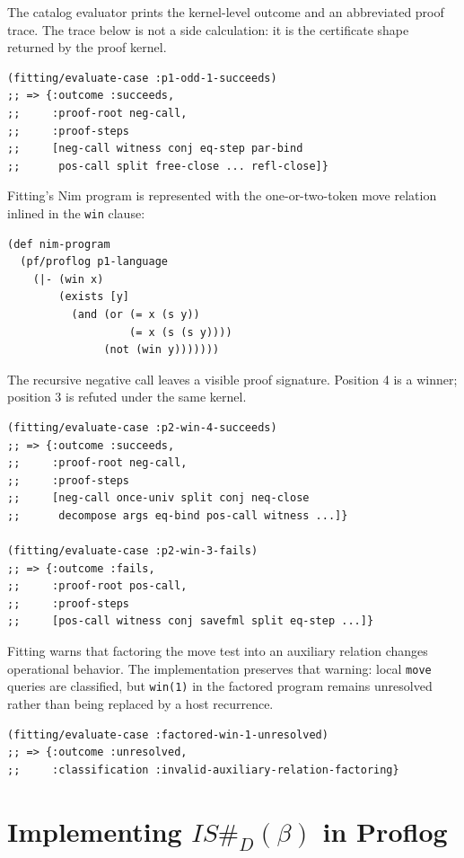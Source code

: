 \documentclass[runningheads]{llncs}
\begin{document}
The catalog evaluator prints the kernel-level outcome and an abbreviated proof
trace.  The trace below is not a side calculation: it is the certificate shape
returned by the proof kernel.

\begin{lstlisting}
(fitting/evaluate-case :p1-odd-1-succeeds)
;; => {:outcome :succeeds,
;;     :proof-root neg-call,
;;     :proof-steps
;;     [neg-call witness conj eq-step par-bind
;;      pos-call split free-close ... refl-close]}
\end{lstlisting}

Fitting's Nim program is represented with the one-or-two-token move relation
inlined in the \texttt{win} clause:

\begin{lstlisting}
(def nim-program
  (pf/proflog p1-language
    (|- (win x)
        (exists [y]
          (and (or (= x (s y))
                   (= x (s (s y))))
               (not (win y)))))))
\end{lstlisting}

The recursive negative call leaves a visible proof signature.  Position 4 is a
winner; position 3 is refuted under the same kernel.

\begin{lstlisting}
(fitting/evaluate-case :p2-win-4-succeeds)
;; => {:outcome :succeeds,
;;     :proof-root neg-call,
;;     :proof-steps
;;     [neg-call once-univ split conj neq-close
;;      decompose args eq-bind pos-call witness ...]}

(fitting/evaluate-case :p2-win-3-fails)
;; => {:outcome :fails,
;;     :proof-root pos-call,
;;     :proof-steps
;;     [pos-call witness conj savefml split eq-step ...]}
\end{lstlisting}

Fitting warns that factoring the move test into an auxiliary relation changes
operational behavior.  The implementation preserves that warning: local
\texttt{move} queries are classified, but \texttt{win(1)} in the factored
program remains unresolved rather than being replaced by a host recurrence.

\begin{lstlisting}
(fitting/evaluate-case :factored-win-1-unresolved)
;; => {:outcome :unresolved,
;;     :classification :invalid-auxiliary-relation-factoring}
\end{lstlisting}

\section{Implementing \(IS\#_D(\beta)\) in Proflog}
\end{document}
